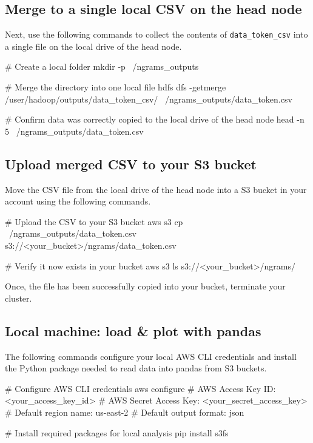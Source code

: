 \documentclass[11pt]{article}
\begin{document}
\subsection{Merge to a single local CSV on the head node}

Next, use the following commands to collect the contents of \texttt{data\_token\_csv} into a single file on the local drive of the head node.\\

\begin{terminal}
# Create a local folder
mkdir -p ~/ngrams_outputs

# Merge the directory into one local file
hdfs dfs -getmerge /user/hadoop/outputs/data_token_csv/ ~/ngrams_outputs/data_token.csv

# Confirm data was correctly copied to the local drive of the head node
head -n 5 ~/ngrams_outputs/data_token.csv
\end{terminal}

\subsection{Upload merged CSV to your S3 bucket}

Move the CSV file from the local drive of the head node into a S3 bucket in your account using the following commands.\\

\begin{terminal}
# Upload the CSV to your S3 bucket
aws s3 cp ~/ngrams_outputs/data_token.csv  s3://<your_bucket>/ngrams/data_token.csv

# Verify it now exists in your bucket
aws s3 ls s3://<your_bucket>/ngrams/
\end{terminal}
Once, the file has been successfully copied into your bucket, terminate your cluster.

\subsection{Local machine: load \& plot with pandas}
The following commands configure your local AWS CLI credentials and install the Python package needed to read data into pandas from S3 buckets.\\

\begin{terminal}
# Configure AWS CLI credentials 
aws configure
#   AWS Access Key ID: <your_access_key_id>
#   AWS Secret Access Key: <your_secret_access_key>
#   Default region name:   us-east-2 
#   Default output format: json

# Install required packages for local analysis
pip install s3fs
\end{terminal}
\end{document}
